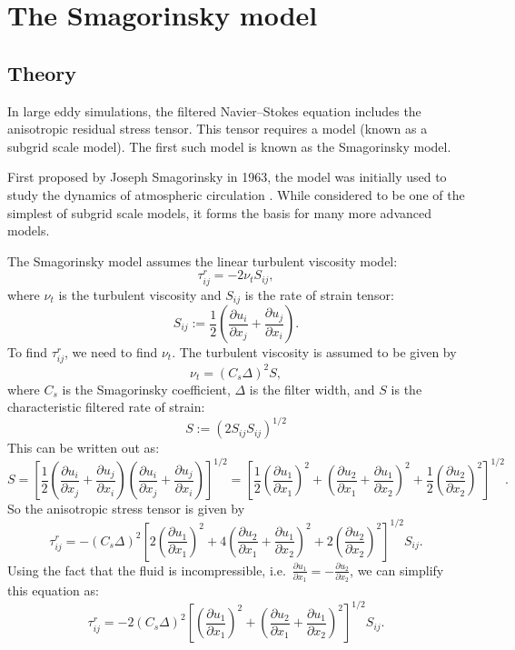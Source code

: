 \documentclass[11pt,a4paper]{article}
\begin{document}
\section{The Smagorinsky model}
\subsection{Theory}
In large eddy simulations, the filtered Navier--Stokes equation includes the anisotropic residual stress tensor. This tensor requires a model (known as a subgrid scale model). The first such model is known as the Smagorinsky model.

First proposed by Joseph Smagorinsky in 1963, the model was initially used to study the dynamics of atmospheric circulation \cite{Smagorinsky1963}. While considered to be one of the simplest of subgrid scale models, it forms the basis for many more advanced  models. 

The Smagorinsky model assumes the linear turbulent viscosity model:
$$\tau_{ij}^r = -2\nu_t {S}_{ij},$$
where $\nu_t$ is the turbulent viscosity and $S_{ij}$ is the rate of strain tensor:
$${S}_{ij} := \frac{1}{2}\left( \frac{\partial {u}_i}{\partial x_j} + \frac{\partial {u}_j}{\partial x_i}\right).$$
To find $\tau_{ij}^r$, we need to find $\nu_t$. The turbulent viscosity is assumed to be given by
$$\nu_t = (C_s \Delta)^2 {S},$$
where $C_s$ is the Smagorinsky coefficient, $\Delta$ is the filter width, and ${S}$ is the characteristic filtered rate of strain:
$${S} := \left(2{S}_{ij}{S}_{ij}\right)^{1/2}$$
This can be written out as:
$${S} = \left[\frac{1}{2}\left( \frac{\partial {u}_i}{\partial x_j} + \frac{\partial {u}_j}{\partial x_i}\right)\left( \frac{\partial {u}_i}{\partial x_j} + \frac{\partial {u}_j}{\partial x_i}\right)\right]^{1/2} = \left[\frac{1}{2}\left( \frac{\partial {u}_1}{\partial x_1}\right)^2+\left( \frac{\partial {u}_2}{\partial x_1} + \frac{\partial {u}_1}{\partial x_2}\right)^2+\frac{1}{2}\left( \frac{\partial {u}_2}{\partial x_2}\right)^2 \right]^{1/2}.$$
So the anisotropic stress tensor is given by
\begin{equation}
\tau_{ij}^r = -(C_s \Delta)^2\left[2\left( \frac{\partial {u}_1}{\partial x_1}\right)^2+4\left( \frac{\partial {u}_2}{\partial x_1} + \frac{\partial {u}_1}{\partial x_2}\right)^2+2\left( \frac{\partial {u}_2}{\partial x_2}\right)^2 \right]^{1/2}{S}_{ij}.
\end{equation}
Using the fact that the fluid is incompressible, i.e.\ $\frac{\partial {u}_1}{\partial x_1} = -\frac{\partial {u}_2}{\partial x_2}$, we can simplify this equation as:
\begin{equation}\label{smagTau}
\tau_{ij}^r = -2(C_s \Delta)^2\left[\left( \frac{\partial {u}_1}{\partial x_1}\right)^2+\left( \frac{\partial {u}_2}{\partial x_1} + \frac{\partial {u}_1}{\partial x_2}\right)^2 \right]^{1/2}{S}_{ij}.
\end{equation}
\end{document}
